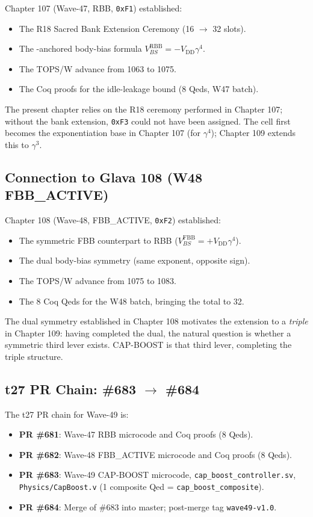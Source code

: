 \documentclass[12pt,a4paper]{report}
\theoremstyle{plain}
\theoremstyle{definition}
\theoremstyle{remark}
\newcommand{\Vdd}{V_{\mathrm{DD}}}
\newcommand{\Bseven}{\mathrm{B007}}
\begin{document}
Chapter 107 (Wave-47, RBB, \texttt{0xF1}) established:
\begin{itemize}[leftmargin=1.5em]
  \item The R18 Sacred Bank Extension Ceremony (16 $\to$ 32 slots).
  \item The \Bseven{}-anchored body-bias formula $V_{BS}^{\mathrm{RBB}} = -\Vdd\gamma^{4}$.
  \item The TOPS/W advance from 1063 to 1075.
  \item The Coq proofs for the idle-leakage bound (8 Qeds, W47 batch).
\end{itemize}
The present chapter relies on the R18 ceremony performed in Chapter 107;
without the bank extension, \texttt{0xF3} could not have been assigned.
The \Bseven{} cell first becomes the exponentiation base in Chapter 107
(for $\gamma^{4}$); Chapter 109 extends this to $\gamma^{3}$.

\subsection{Connection to Glava 108 (W48 FBB\_ACTIVE)}
\label{ssec:glava108}

Chapter 108 (Wave-48, FBB\_ACTIVE, \texttt{0xF2}) established:
\begin{itemize}[leftmargin=1.5em]
  \item The symmetric FBB counterpart to RBB ($V_{BS}^{\mathrm{FBB}} = +\Vdd\gamma^{4}$).
  \item The dual body-bias symmetry (same exponent, opposite sign).
  \item The TOPS/W advance from 1075 to 1083.
  \item The 8 Coq Qeds for the W48 batch, bringing the total to 32.
\end{itemize}
The dual symmetry established in Chapter 108 motivates the extension to a
\emph{triple} in Chapter 109: having completed the dual, the natural question
is whether a symmetric third lever exists.
CAP-BOOST is that third lever, completing the triple structure.

\subsection{t27 PR Chain: \#683 $\to$ \#684}
\label{ssec:pr-chain-cross}

The t27 PR chain for Wave-49 is:
\begin{itemize}[leftmargin=1.5em]
  \item \textbf{PR \#681}: Wave-47 RBB microcode and Coq proofs (8 Qeds).
  \item \textbf{PR \#682}: Wave-48 FBB\_ACTIVE microcode and Coq proofs (8 Qeds).
  \item \textbf{PR \#683}: Wave-49 CAP-BOOST microcode, \texttt{cap\_boost\_controller.sv},
    \texttt{Physics/CapBoost.v} (1 composite Qed = \texttt{cap\_boost\_composite}).
  \item \textbf{PR \#684}: Merge of \#683 into master; post-merge tag \texttt{wave49-v1.0}.
\end{itemize}
\end{document}
